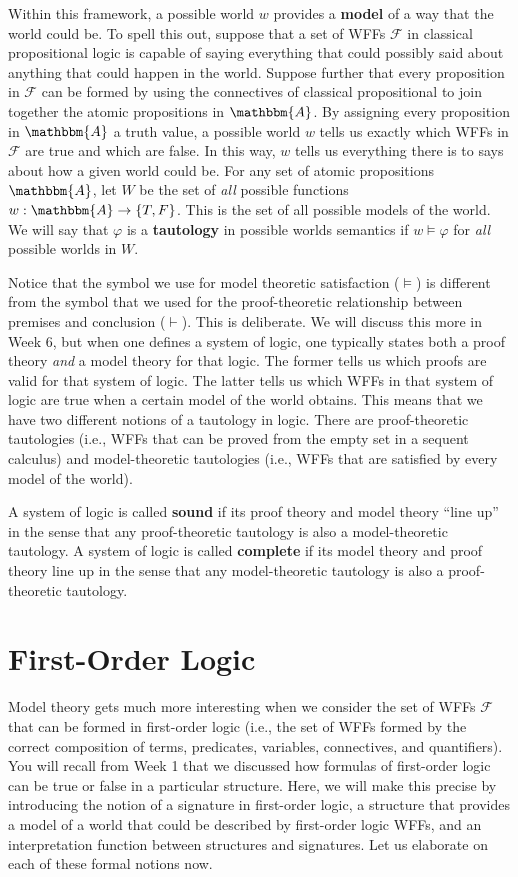 \documentclass[11pt]{article}
\theoremstyle{definition}
\theoremstyle{remark}
\begin{document}
Within this framework, a possible world $w$ provides a \textbf{model} of a way that the world could be. To spell this out, suppose that a set of WFFs $\mathcal{F}$ in classical propositional logic is capable of saying everything that could possibly said about anything that could happen in the world. Suppose further that every proposition in $\mathcal{F}$ can be formed by using the connectives of classical propositional to join together the atomic propositions in $\mathbbm{A}$. By assigning every proposition in $\mathbbm{A}$ a truth value, a possible world $w$ tells us exactly which WFFs in $\mathcal{F}$ are true and which are false. In this way, $w$ tells us everything there is to says about how a given world could be. For any set of atomic propositions $\mathbbm{A}$, let $W$ be the set of \textit{all} possible functions $w:\mathbbm{A}\rightarrow\{T,F\}$. This is the set of all possible models of the world. We will say that $\varphi$ is a \textbf{tautology} in possible worlds semantics if $w\vDash\varphi$ for \textit{all} possible worlds in $W$.\par

Notice that the symbol we use for model theoretic satisfaction ($\vDash$) is different from the symbol that we used for the proof-theoretic relationship between premises and conclusion ($\vdash$). This is deliberate. We will discuss this more in Week 6, but when one defines a system of logic, one typically states both a proof theory \textit{and} a model theory for that logic. The former tells us which proofs are valid for that system of logic. The latter tells us which WFFs in that system of logic are true when a certain model of the world obtains. This means that we have two different notions of a tautology in logic. There are proof-theoretic tautologies (i.e., WFFs that can be proved from the empty set in a sequent calculus) and model-theoretic tautologies (i.e., WFFs that are satisfied by every model of the world).


A system of logic is called \textbf{sound} if its proof theory and model theory ``line up'' in the sense that any proof-theoretic tautology is also a model-theoretic tautology. A system of logic is called \textbf{complete} if its model theory and proof theory line up in the sense that any model-theoretic tautology is also a proof-theoretic tautology.\par 


\section{First-Order Logic}
Model theory gets much more interesting when we consider the set of WFFs $\mathcal{F}$ that can be formed in first-order logic (i.e., the set of WFFs formed by the correct composition of terms, predicates, variables, connectives, and quantifiers). You will recall from Week 1 that we discussed how formulas of first-order logic can be true or false in a particular structure. Here, we will make this precise by introducing the notion of a signature in first-order logic, a structure that provides a model of a world that could be described by first-order logic WFFs, and an interpretation function between structures and signatures. Let us elaborate on each of these formal notions now.
\end{document}
